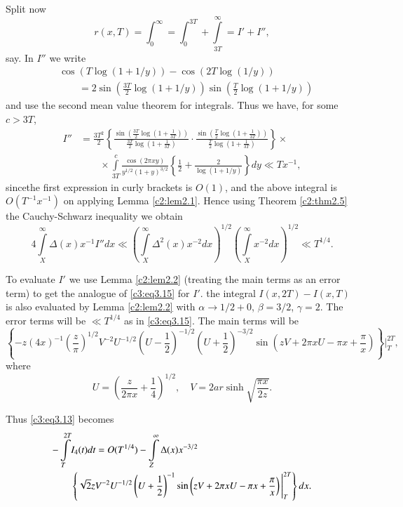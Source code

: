 Split now 
$$
r(x, T) = \int_0^\infty = \int_0^{3T} + \int\limits_{3T}^\infty = I' + I'',
$$
say. In $I''$ we write
\begin{align*}
&\cos (T \log (1+ 1/y))- \cos (2T \log (1/y))\\
&\qquad = 2 \sin
\left(\frac{3T}{2} \log (1+ 1/y) \right) \sin \left(\frac{T}{2} \log
(1+ 1/y) \right)
\end{align*}
and use the second mean value theorem for integrals. Thus we have, for
some $c > 3T$,
\begin{align*}
  I'' &= \frac{3T^2}{2} \left\{\frac{\sin \left(\frac{3T}{2} \log
    \left(1+ \frac{1}{3T} \right) \right)}{\frac{3T}{2} \log \left(1+
    \frac{1}{3 T} \right)} \cdot \frac{\sin \left(\frac{T}{2} \log
    \left(1+ \frac{1}{3T} \right) \right)}{\frac{T}{2} \log \left(1+
    \frac{1}{3T} \right)} \right\} \times\\
    &\qquad \times \int\limits_{3T}^c \frac{\cos (2 \pi x y)}{y^{1/2} (1+
      y)^{3/2}} \left\{ \frac{1}{2} + \frac{2}{\log (1+ 1/y)}\right\}
    dy \ll Tx^{-1},
\end{align*}
since\pageoriginale the first expression in curly brackets is $O(1)$,
and the above integral is $O(T^{-1} x^{-1})$ on applying Lemma
\ref{c2:lem2.1}. Hence using Theorem \ref{c2:thm2.5} the
Cauchy-Schwarz inequality we obtain
{\fontsize{10pt}{12pt}\selectfont
\begin{equation}
  4 \int\limits_X^\infty \Delta (x) x^{-1} I'' dx \ll
  \left(\int\limits_X^\infty \Delta^2 (x) x^{-2} dx \right)^{1/2}
  \left(\int\limits_{X}^\infty x^{-2} dx\right)^{1/2} \ll
  T^{1/4}.\label{c3:eq3.15} 
\end{equation}}

To evaluate $I'$ we use Lemma \ref{c2:lem2.2} (treating the main terms
as an error term) to get the analogue of \eqref{c3:eq3.15} for
$I'$. the integral $I (x, 2T)- I (x, T)$ is also evaluated by Lemma
\ref{c2:lem2.2} with $\alpha \to 1/2 + 0$, $\beta = 3/2$, $\gamma
=2$. The error terms will be $\ll T^{1/4}$ as in
\eqref{c3:eq3.15}. The main terms will be
{\fontsize{9}{7}\selectfont
$$
\left\{-z (4x)^{-1} \left( \frac{z}{\pi}\right)^{1/2} V^{-2} U^{-1/2}
\left(U- \frac{1}{2} \right)^{-1/2} \left(U + \frac{1}{2}
\right)^{-3/2} \sin \left(zV + 2  \pi x U- \pi x + \frac{\pi}{x}\right)
\right\}\Bigg|_T^{2T}, 
$$}
where
$$
U= \left(\frac{z}{2 \pi x}+ \frac{1}{4} \right)^{1/2},\quad V= 2 ar \sinh
\sqrt{\frac{\pi x}{2z}}.
$$

Thus \eqref{c3:eq3.13} becomes 
{\fontsize{10pt}{12pt}\selectfont
\begin{align}
  - \int\limits_T^{2T}&  I_4 (t) dt = O(T^{1/4}) - \int\limits_Z^\infty
  \Delta (x) x^{-3/2}\notag \label{c3:eq3.16}\\
& \left\{\sqrt{2} z V^{-2} U^{-1/2} \left(U + \frac{1}{2} \right)^{-1}
  \sin \left(zV + 2 \pi x U -\pi x + \frac{\pi}{x}\right)
  \Bigg|_T^{2T}\right\} dx.
\end{align}}

